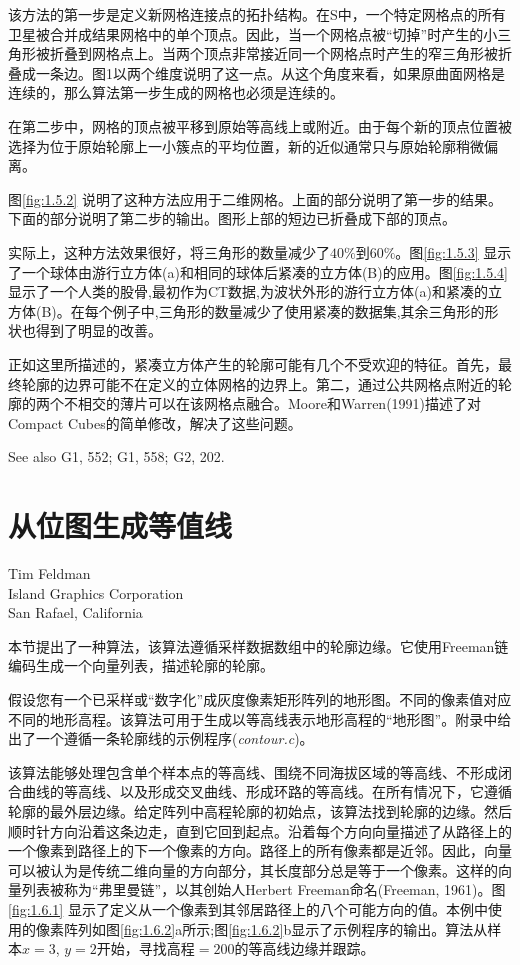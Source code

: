 \begin{CJK}{UTF8}{gbsn}
该方法的第一步是定义新网格连接点的拓扑结构。在S中，一个特定网格点的所有卫星被合并成结果网格中的单个顶点。因此，当一个网格点被“切掉”时产生的小三角形被折叠到网格点上。当两个顶点非常接近同一个网格点时产生的窄三角形被折叠成一条边。图1以两个维度说明了这一点。从这个角度来看，如果原曲面网格是连续的，那么算法第一步生成的网格也必须是连续的。

在第二步中，网格的顶点被平移到原始等高线上或附近。由于每个新的顶点位置被选择为位于原始轮廓上一小簇点的平均位置，新的近似通常只与原始轮廓稍微偏离。

图\ref{fig:1.5.2} 说明了这种方法应用于二维网格。上面的部分说明了第一步的结果。下面的部分说明了第二步的输出。图形上部的短边已折叠成下部的顶点。

实际上，这种方法效果很好，将三角形的数量减少了$40\%$到$60\%$。图\ref{fig:1.5.3} 显示了一个球体由游行立方体(a)和相同的球体后紧凑的立方体(B)的应用。图\ref{fig:1.5.4}显示了一个人类的股骨,最初作为CT数据,为波状外形的游行立方体(a)和紧凑的立方体(B)。在每个例子中,三角形的数量减少了使用紧凑的数据集,其余三角形的形状也得到了明显的改善。

正如这里所描述的，紧凑立方体产生的轮廓可能有几个不受欢迎的特征。首先，最终轮廓的边界可能不在定义的立体网格的边界上。第二，通过公共网格点附近的轮廓的两个不相交的薄片可以在该网格点融合。Moore和Warren(1991)描述了对Compact Cubes的简单修改，解决了这些问题。


See also G1, 552; G1, 558; G2, 202.

\newpage
\section{从位图生成等值线}
\begin{center}
\small{
Tim Feldman\\
Island Graphics Corporation\\
San Rafael, California}
\end{center}


本节提出了一种算法，该算法遵循采样数据数组中的轮廓边缘。它使用Freeman链编码生成一个向量列表，描述轮廓的轮廓。

假设您有一个已采样或“数字化”成灰度像素矩形阵列的地形图。不同的像素值对应不同的地形高程。该算法可用于生成以等高线表示地形高程的“地形图”。附录中给出了一个遵循一条轮廓线的示例程序(\textit{contour.c})。

该算法能够处理包含单个样本点的等高线、围绕不同海拔区域的等高线、不形成闭合曲线的等高线、以及形成交叉曲线、形成环路的等高线。在所有情况下，它遵循轮廓的最外层边缘。给定阵列中高程轮廓的初始点，该算法找到轮廓的边缘。然后顺时针方向沿着这条边走，直到它回到起点。沿着每个方向向量描述了从路径上的一个像素到路径上的下一个像素的方向。路径上的所有像素都是近邻。因此，向量可以被认为是传统二维向量的方向部分，其长度部分总是等于一个像素。这样的向量列表被称为“弗里曼链”，以其创始人Herbert Freeman命名(Freeman, 1961)。图\ref{fig:1.6.1} 显示了定义从一个像素到其邻居路径上的八个可能方向的值。本例中使用的像素阵列如图\ref{fig:1.6.2}a所示;图\ref{fig:1.6.2}b显示了示例程序的输出。算法从样本$x = 3$, $y = 2$开始，寻找$\text{高程}= 200$的等高线边缘并跟踪。


\end{CJK}

